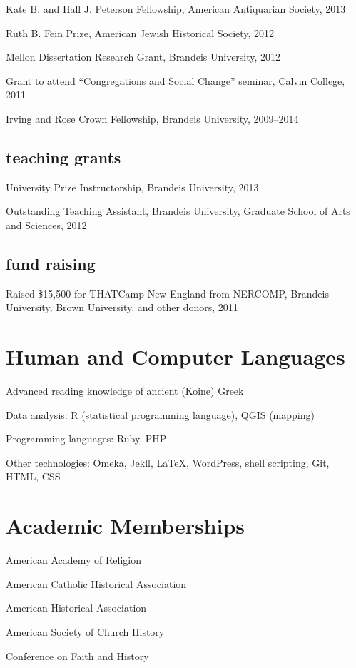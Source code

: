 \documentclass[11pt]{article}
\begin{document}
Kate B. and Hall J. Peterson Fellowship, American Antiquarian Society, 2013

Ruth B. Fein Prize, American Jewish Historical Society, 2012

Mellon Dissertation Research Grant, Brandeis University, 2012

Grant to attend ``Congregations and Social Change'' seminar, Calvin 
College, 2011

Irving and Rose Crown Fellowship, Brandeis University, 2009--2014

\subsection{teaching grants}

University Prize Instructorship, Brandeis University, 2013

Outstanding Teaching Assistant, Brandeis University, Graduate School of 
Arts and Sciences, 2012

\subsection{fund raising}

Raised \$15,500 for THATCamp New England from NERCOMP, Brandeis 
University, Brown University, and other donors, 2011

\section{Human and Computer Languages}

Advanced reading knowledge of ancient (Koine) Greek

Data analysis: R (statistical programming language), QGIS (mapping)

Programming languages: Ruby, PHP

Other technologies: Omeka, Jekll, \LaTeX{}, \mbox{WordPress}, shell scripting, 
Git, HTML, CSS

\section{Academic Memberships}

American Academy of Religion

American Catholic Historical Association

American Historical Association

American Society of Church History

Conference on Faith and History
\end{document}
